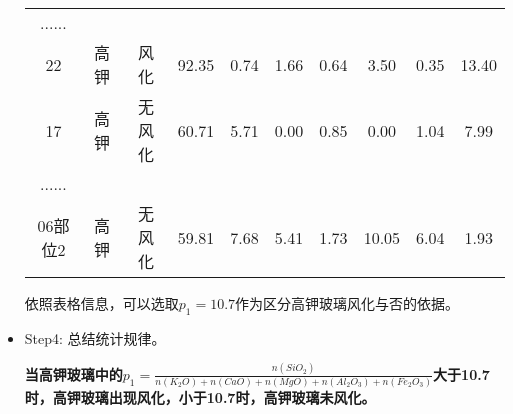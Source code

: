 \documentclass[withoutpreface,bwprint]{cumcmthesis} %
\begin{document}
\begin{itemize}
\begin{table}[!h]
\begin{tabular}{@{}cccccccccc@{}}
			......         &    &    &    &    &    &                       \\
			22                                                        & 高钾          & 风化                                                       & 92.35                                                          & 0.74                                                         & 1.66                                                         & 0.64                                                         & 3.50                                                           & 0.35                                                           & 13.40                                                           \\
			17                                                        & 高钾          & 无风化                                                      & 60.71                                                          & 5.71                                                         & 0.00                                                         & 0.85                                                         & 0.00                                                           & 1.04                                                           & 7.99                                                            \\
			......         &    &    &    &    &    &                       \\
			06部位2                                                     & 高钾          & 无风化                                                      & 59.81                                                          & 7.68                                                         & 5.41                                                         & 1.73                                                         & 10.05                                                          & 6.04                                                           & 1.93                                                            \\ \bottomrule
		\end{tabular}
	\end{table}
	
	
	依照表格信息，可以选取$p_{1}=10.7$作为区分高钾玻璃风化与否的依据。
	
	\item Step4: 总结统计规律。
	
	
	 \textbf{当高钾玻璃中的$p_{1}=\frac{n(SiO_{2})}{n(K_{2}O)+n(CaO)+n(MgO)+n(Al_{2}O_{3})+n(Fe_{2}O_{3})}$大于10.7时，高钾玻璃出现风化，小于10.7时，高钾玻璃未风化。}
	
\end{itemize}
\end{document}
